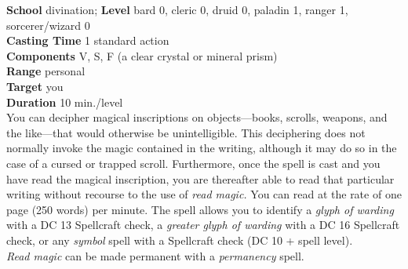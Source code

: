 \textbf{School} divination; \textbf{Level} bard 0, cleric 0, druid 0, paladin 1, ranger 1, sorcerer/wizard 0\\
\textbf{Casting Time} 1 standard action\\
\textbf{Components} V, S, F (a clear crystal or mineral prism)\\
\textbf{Range} personal\\
\textbf{Target} you\\
\textbf{Duration} 10 min./level\\
You can decipher magical inscriptions on objects—books, scrolls, weapons, and the like—that would otherwise be unintelligible. This deciphering does not normally invoke the magic contained in the writing, although it may do so in the case of a cursed or trapped scroll. Furthermore, once the spell is cast and you have read the magical inscription, you are thereafter able to read that particular writing without recourse to the use of \textit{read magic. }You can read at the rate of one page (250 words) per minute. The spell allows you to identify a \textit{glyph of warding }with a DC 13 Spellcraft check, a \textit{greater glyph of warding }with a DC 16 Spellcraft check, or any \textit{symbol }spell with a Spellcraft check (DC 10 + spell level).\\
\textit{Read magic }can be made permanent with a \textit{permanency }spell.\\
